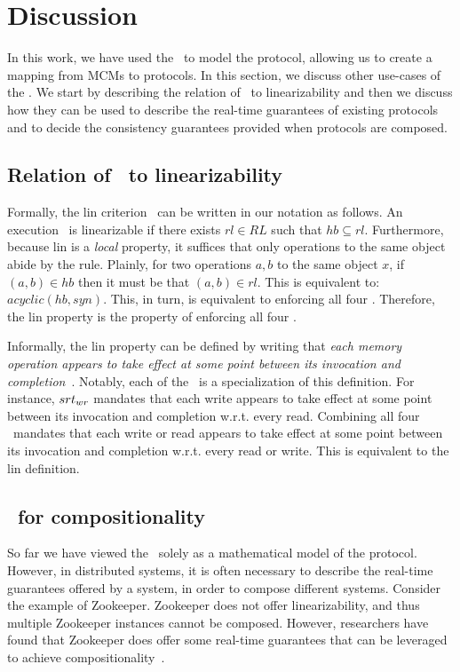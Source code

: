 \section{Discussion} \label{sec:disc}
In this work, we have used the \rts\ to model the protocol, allowing us to create a mapping from MCMs to protocols. In this section, we discuss other use-cases of the \rts. We start by describing the relation of \srts\ to linearizability and then we discuss  how they can be used to describe the real-time guarantees of existing protocols and to decide the consistency guarantees provided when protocols are composed.

\subsection{Relation of \srts\ to linearizability}\label{disc:lin}
Formally, the lin criterion~\cite{Herlihy:1990} can be written in our notation as follows.
An execution \Exec\ is linearizable if there exists $rl \in RL$ such that $hb \subseteq rl$. Furthermore, because lin is a \emph{local} property, it suffices that only operations to the same object abide by the rule. Plainly, for two operations $a,b$ to the same object $x$, if $(a,b) \in hb$ then it must be that $(a,b) \in rl$. This is equivalent to: $acyclic(hb, syn)$.
This, in turn, is equivalent to enforcing all four \srts.
Therefore, the lin property is the property of enforcing all four \srts.


Informally, the lin property can be defined by writing that \emph{each memory operation appears to take effect at some point between its invocation and completion}~\cite{Herlihy:2008}.
Notably, each of the \srts\ is a specialization of this definition.
For instance, $srt_{wr}$ mandates that each write appears to take effect at some point between its invocation and completion w.r.t. every read.
Combining all four \srts\ mandates that each write or read appears to take effect at some point between its invocation and completion w.r.t. every read or write. This is equivalent to the lin definition.

\subsection{\Srts\ for compositionality}\label{disc:cons}

So far we have viewed the \srts\ solely as a mathematical model of the protocol.
However, in distributed systems, it is often necessary to describe the real-time guarantees offered by a system, in order to compose different systems.
Consider the example of Zookeeper. Zookeeper does not offer linearizability, and thus multiple Zookeeper instances cannot be composed. However, researchers have found that Zookeeper does offer some real-time guarantees that can be leveraged to achieve compositionality~\cite{LevAri:2016}.

